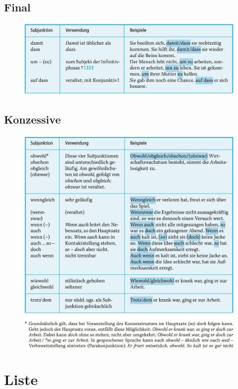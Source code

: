 \documentclass[UTF8]{report}
\begin{document}
\subsection{Final}
\begin{figure}[H]
    \centering
    \includegraphics[scale=0.55]{fin.png}
\end{figure}

\subsection{Konzessive}
\begin{figure}[H]
    \centering
    \includegraphics[scale=0.55]{zes.png}
\end{figure}



\section{Liste}
\end{document}
